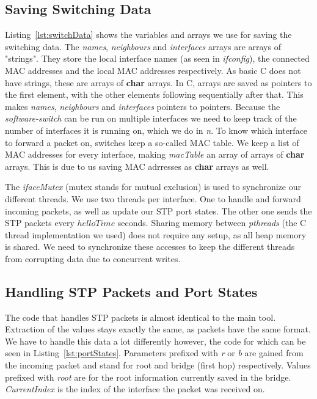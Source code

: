 \subsection{Saving Switching Data}

Listing~\ref{lst:switchData} shows the variables and arrays we use for saving the switching data.
The \textit{names}, \textit{neighbours} and \textit{interfaces} arrays are arrays of "strings".
They store the local interface names (as seen in \textit{ifconfig}), the connected MAC addresses and the local MAC addresses respectively.
As basic C does not have strings, these are arrays of \textbf{char} arrays.
In C, arrays are saved as pointers to the first element, with the other elements following sequentially after that.
This makes \textit{names}, \textit{neighbours} and \textit{interfaces} pointers to pointers.
Because the \textit{software-switch} can be run on multiple interfaces we need to keep track of the number of interfaces it is running on, which we do in \textit{n}.
To know which interface to forward a packet on, switches keep a so-called MAC table.
We keep a list of MAC addresses for every interface, making \textit{macTable} an array of arrays of \textbf{char} arrays.
This is due to us saving MAC adrresses as \textbf{char} arrays as well.

The \textit{ifaceMutex} (mutex stands for mutual exclusion) is used to synchronize our different threads.
We use two threads per interface.
One to handle and forward incoming packets, as well as update our STP port states.
The other one sends the STP packets every $helloTime$ seconds.
Sharing memory between \textit{pthreads} (the C thread implementation we used) does not require any setup, as all heap memory is shared\cite{pthreads}.
We need to synchronize these accesses to keep the different threads from corrupting data due to concurrent writes.

\subsection{Handling STP Packets and Port States}
The code that handles STP packets is almost identical to the main tool.
Extraction of the values stays exactly the same, as packets have the same format.
We have to handle this data a lot differently however, the code for which can be seen in Listing~\ref{lst:portStates}.
Parameters prefixed with \textit{r} or \textit{b} are gained from the incoming packet and stand for root and bridge (first hop) respectively.
Values prefixed with \textit{root} are for the root information currently saved in the bridge.
\textit{CurrentIndex} is the index of the interface the packet was received on.



